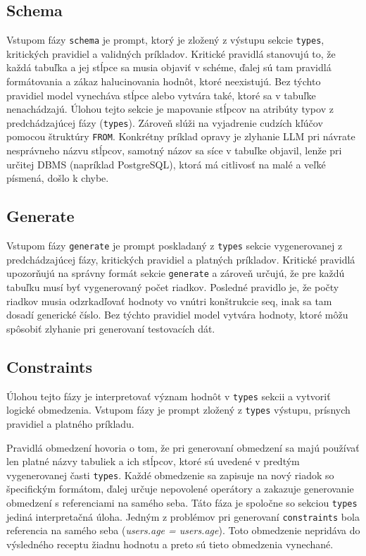 \subsection{Schema}
\label{sub_sub:schema}
Vstupom fázy \texttt{schema} je prompt, ktorý je zložený z výstupu sekcie \texttt{types}, kritických pravidiel a validných príkladov. Kritické pravidlá stanovujú to, že každá tabuľka a jej stĺpce sa musia objaviť v schéme, ďalej sú tam pravidlá formátovania a zákaz halucinovania hodnôt, ktoré neexistujú. Bez týchto pravidiel model vynecháva stĺpce alebo vytvára také, ktoré sa v tabuľke nenachádzajú. Úlohou tejto sekcie je mapovanie stĺpcov na atribúty typov z predchádzajúcej fázy (\texttt{types}). Zároveň slúži na vyjadrenie cudzích kľúčov pomocou štruktúry \texttt{FROM}.  Konkrétny príklad opravy je zlyhanie LLM pri návrate nesprávneho názvu stĺpcov, samotný názov sa síce v tabuľke objavil, lenže pri určitej DBMS (napríklad PostgreSQL), ktorá má citlivosť na malé a veľké písmená, došlo k chybe. 

\subsection{Generate}
\label{sub_sub:generate}
Vstupom fázy \texttt{generate} je prompt poskladaný z \texttt{types} sekcie vygenerovanej z predchádzajúcej fázy, kritických pravidiel a platných príkladov. Kritické pravidlá upozorňujú na správny formát sekcie \texttt{generate} a zároveň určujú, že pre každú tabuľku musí byť vygenerovaný počet riadkov. Posledné pravidlo je, že počty riadkov musia odzrkadľovať hodnoty vo vnútri konštrukcie seq, inak sa tam dosadí generické číslo. Bez týchto pravidiel model vytvára hodnoty, ktoré môžu spôsobiť zlyhanie pri generovaní testovacích dát. 

\subsection{Constraints}
\label{sub_sub:constraints}
Úlohou tejto fázy je interpretovať význam hodnôt v \texttt{types} sekcii a vytvoriť logické obmedzenia. Vstupom fázy je prompt zložený z \texttt{types} výstupu, prísnych pravidiel a platného príkladu. 

Pravidlá obmedzení hovoria o tom, že pri generovaní obmedzení sa majú používať len platné názvy tabuliek a ich stĺpcov, ktoré sú uvedené v predtým vygenerovanej časti \texttt{types}. Každé obmedzenie sa zapisuje na nový riadok so špecifickým formátom, ďalej určuje nepovolené operátory a zakazuje generovanie obmedzení s referenciami na samého seba. Táto fáza je spoločne so sekciou \texttt{types} jediná interpretačná úloha. Jedným z problémov pri generovaní \texttt{constraints} bola referencia na samého seba \newline (\textit{users.age = users.age}). Toto obmedzenie nepridáva do výsledného receptu žiadnu hodnotu a preto sú tieto obmedzenia vynechané.



